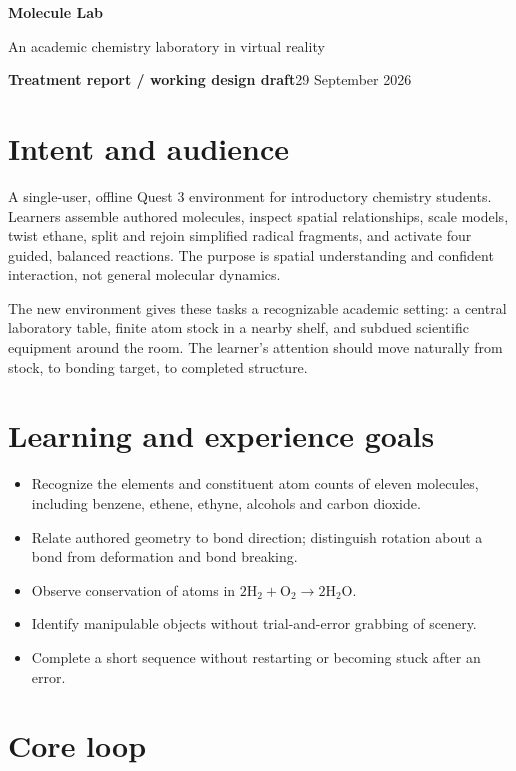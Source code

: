 {\Huge\bfseries\color{ink} Molecule Lab}\par
{\Large An academic chemistry laboratory in virtual reality}\par
\textbf{Treatment report / working design draft}\hfill 29 September 2026

\section*{Intent and audience}
A single-user, offline Quest 3 environment for introductory chemistry students. Learners assemble authored molecules, inspect spatial relationships, scale models, twist ethane, split and rejoin simplified radical fragments, and activate four guided, balanced reactions. The purpose is spatial understanding and confident interaction, not general molecular dynamics.

The new environment gives these tasks a recognizable academic setting: a central laboratory table, finite atom stock in a nearby shelf, and subdued scientific equipment around the room. The learner's attention should move naturally from stock, to bonding target, to completed structure.

\section*{Learning and experience goals}
\begin{itemize}
\item Recognize the elements and constituent atom counts of eleven molecules, including benzene, ethene, ethyne, alcohols and carbon dioxide.
\item Relate authored geometry to bond direction; distinguish rotation about a bond from deformation and bond breaking.
\item Observe conservation of atoms in $2\mathrm{H}_2+\mathrm{O}_2\rightarrow2\mathrm{H}_2\mathrm{O}$.
\item Identify manipulable objects without trial-and-error grabbing of scenery.
\item Complete a short sequence without restarting or becoming stuck after an error.
\end{itemize}

\section*{Core loop}
\begin{center}
\end{center}


